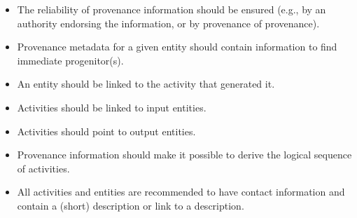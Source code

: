 \begin{itemize}


\item The reliability of provenance information should be ensured (e.g., by an authority endorsing the information, or by provenance of provenance).

\item Provenance metadata for a given entity should contain information to find immediate progenitor(s).

\item An entity should be linked to the activity that generated it.

\item Activities should be linked to input entities.

\item Activities should point to output entities.

\item Provenance information should make it possible to derive the logical sequence of activities.

\item All activities and entities are recommended to have contact information and contain a (short) description or link to a description.

\end{itemize}

